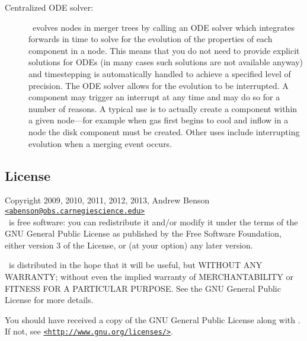 \begin{description}
 \item [Centralized ODE solver:] \glc\ evolves nodes in merger trees by calling an ODE solver which integrates forwards in time to solve for the evolution of the properties of each component in a node. This means that you do not need to provide explicit solutions for ODEs (in many cases such solutions are not available anyway) and timestepping is automatically handled to achieve a specified level of precision. The ODE solver allows for the evolution to be interrupted. A component may trigger an interrupt at any time and may do so for a number of reasons. A typical use is to actually create a component within a given node---for example when gas first begins to cool and inflow in a node the disk component must be created. Other uses include interrupting evolution when a merging event occurs.
\end{description}

\subsection{License}

Copyright 2009, 2010, 2011, 2012, 2013, Andrew Benson \href{mailto:abenson@obs.carnegiescience.edu}{\tt <abenson@obs.carnegiescience.edu>}\\

\glc\ is free software: you can redistribute it and/or modify
it under the terms of the GNU General Public License as published by
the Free Software Foundation, either version 3 of the License, or
(at your option) any later version.

\glc\ is distributed in the hope that it will be useful,
but WITHOUT ANY WARRANTY; without even the implied warranty of
MERCHANTABILITY or FITNESS FOR A PARTICULAR PURPOSE.  See the
GNU General Public License for more details.

You should have received a copy of the GNU General Public License
along with \glc.  If not, see \href{http://www.gnu.org/licenses/}{\tt <http://www.gnu.org/licenses/>}.
